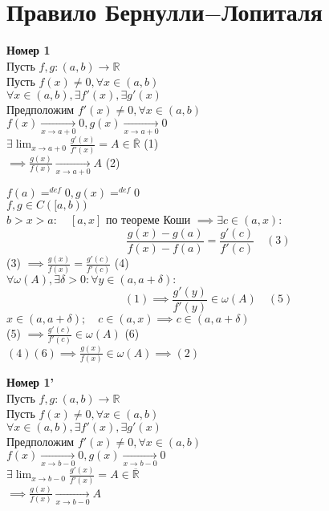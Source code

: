\section{Правило Бернулли$-$Лопиталя}
\begin{theorem}\textbf{Номер 1}\\
	Пусть $f,g: (a,b) \to \mathbb{R}$ \\
	Пусть $f(x) \neq 0, \forall x \in (a,b)$ \\
	$\forall x \in (a,b), \exists f'(x), \exists g'(x)$ \\
	Предположим $f'(x)\neq 0, \forall x \in (a,b)$ \\
	$f(x) \underset{x\to a+0}{\to} 0, g(x)\underset{x\to a+0}{\to} 0$ \\
	$\exists \displaystyle\lim_{x \to a+0} \displaystyle\frac{g'(x)}{f'(x)}=A \in \overline{\mathbb{R}}$ (1)\\
	$\implies \displaystyle\frac{g(x)}{f(x)} \underset{x\to a+0}{\to} A$ (2)
\end{theorem}
\begin{replacementproof}
	$f(a)=^{def}0, g(x)=^{def}0$ \\
	$f,g \in C([a,b))$ \\
	$b>x>a: \quad [a,x]$ по теореме Коши $\implies \exists c \in (a,x):$ 
	\[
	\displaystyle\frac{g(x)-g(a)}{f(x)-f(a)}=\displaystyle\frac{g'(c)}{f'(c)} \quad (3)
	\] 
	(3) $\implies \displaystyle\frac{g(x)}{f(x)}=\displaystyle\frac{g'(c)}{f'(c)}$ (4)\\
	$\forall \omega(A), \exists \delta >0: \forall y \in (a,a+\delta):$ 
	\[
	(1) \implies \displaystyle\frac{g'(y)}{f'(y)} \in \omega(A) \quad (5)
	\] 
	$x \in (a,a+\delta); \quad c \in (a,x)\implies c \in (a,a+\delta)$ \\
	(5) $\implies \displaystyle\frac{g'(c)}{f'(c)} \in \omega(A)$ (6)\\
	$(4)(6) \implies \displaystyle\frac{g(x)}{f(x)} \in \omega(A) \implies (2)$
\end{replacementproof}
\begin{theorem}\textbf{Номер 1'}\\
	Пусть $f,g: (a,b) \to \mathbb{R}$ \\
	Пусть $f(x) \neq 0, \forall x \in (a,b)$ \\
	$\forall x \in (a,b), \exists f'(x), \exists g'(x)$ \\
	Предположим $f'(x)\neq 0, \forall x \in (a,b)$ \\
	$f(x)\underset{x\to b-0}{\to} 0, g(x) \underset{x\to b-0}{\to} 0$ \\
	$\exists \displaystyle\lim_{x \to b-0} \displaystyle\frac{g'(x)}{f'(x)}=A \in \overline{\mathbb{R}}$ \\
	$\implies \displaystyle\frac{g(x)}{f(x)}\underset{x\to b-0}{\to} A$
\end{theorem}
